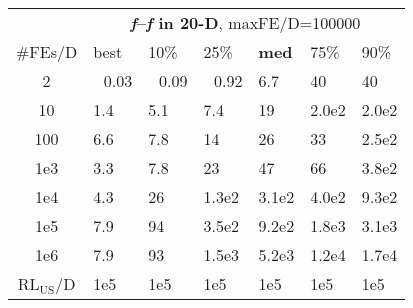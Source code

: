 \begin{tabular}{c|llllll}
 & \multicolumn{6}{|c}{\textbf{\textit{f}\raisebox{-0.35ex}{1}--\textit{f}\raisebox{-0.35ex}{24} in 20-D}, maxFE/D=100000}\\
\#FEs/D & best & 10\% & 25\% & \textbf{med} & 75\% & 90\%\\
2 & ~\,0.03 & ~\,0.09 & ~\,0.92 & \hspace*{1ex}6.7 & 40 & 40\\
10 & \hspace*{1ex}1.4 & \hspace*{1ex}5.1 & \hspace*{1ex}7.4 & 19 & 2.0e2 & 2.0e2\\
100 & \hspace*{1ex}6.6 & \hspace*{1ex}7.8 & 14 & 26 & 33 & 2.5e2\\
1e3 & \hspace*{1ex}3.3 & \hspace*{1ex}7.8 & 23 & 47 & 66 & 3.8e2\\
1e4 & \hspace*{1ex}4.3 & 26 & 1.3e2 & 3.1e2 & 4.0e2 & 9.3e2\\
1e5 & \hspace*{1ex}7.9 & 94 & 3.5e2 & 9.2e2 & 1.8e3 & 3.1e3\\
1e6 & \hspace*{1ex}7.9 & 93 & 1.5e3 & 5.2e3 & 1.2e4 & 1.7e4\\
$\text{RL}_{\text{US}}$/D & 1e5 & 1e5 & 1e5 & 1e5 & 1e5 & 1e5
\end{tabular}
